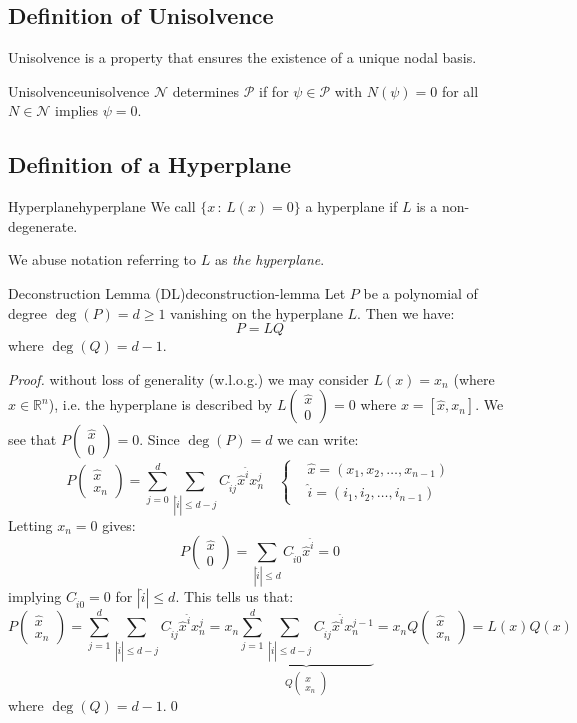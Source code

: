 \subsection{Definition of Unisolvence}
Unisolvence is a property that ensures the existence of a unique nodal basis.
\begin{definition}{Unisolvence}{unisolvence}
    $\mathcal{N}$ determines $\mathcal{P}$ if for $\psi \in \mathcal{P}$ with $N(\psi) = 0$ for all $N \in \mathcal{N}$ implies $\psi = 0$.
\end{definition}

\subsection{Definition of a Hyperplane}
\begin{definition}{Hyperplane}{hyperplane}
    We call $\{x \, : \, L(x) = 0\}$ a hyperplane if $L$ is a non-degenerate.
\end{definition}

We abuse notation referring to $L$ as \emph{the hyperplane}.

\begin{lemma}{Deconstruction Lemma (DL)}{deconstruction-lemma}
    Let $P$ be a polynomial of degree $\deg(P) = d \geq 1$ vanishing on the hyperplane $L$. Then we have:
    \[
        P = L Q
    \]
    where $\deg(Q) = d - 1$.
\end{lemma}
\begin{proof}
    without loss of generality (w.l.o.g.) we may consider $L(x) = x_n$ (where $x \in \mathbb{R}^n$), i.e. the hyperplane is described by $L(\substack{\hat{x} \\ 0}) = 0$ where $x = [\hat{x}, x_n]$.
    We see that $P(\substack{\hat{x} \\ 0}) = 0$. Since $\deg(P) = d$ we can write:
    \[
        P(\substack{\hat{x} \\ x_n}) = \sum_{j=0}^d \sum_{|\hat{i}| \leq d - j} C_{\hat{i}j} \hat{x}^{\hat{i}} x_n^j \quad \begin{cases}
             & \hat{x} = (x_1, x_2, \ldots, x_{n-1}) \\
             & \hat{i} = (i_1, i_2, \ldots, i_{n-1})
        \end{cases}
    \]
    Letting $x_n = 0$ gives:
    \[
        P(\substack{\hat{x} \\ 0}) = \sum_{|\hat{i}| \leq d} C_{\hat{i}0} \hat{x}^{\hat{i}} = 0
    \]
    implying $C_{\hat{i}0} = 0$ for $|\hat{i}| \leq d$. This tells us that:
    \[
        P(\substack{\hat{x} \\ x_n}) = \sum_{j=1}^d \sum_{|\hat{i}| \leq d - j} C_{\hat{i}j} \hat{x}^{\hat{i}} x_n^j = x_n \underbrace{\sum_{j=1}^d \sum_{|\hat{i}| \leq d - j} C_{\hat{i}j} \hat{x}^{\hat{i}} x_n^{j-1}}_{Q(\substack{\hat{x} \\ x_n})} = x_n Q(\substack{\hat{x} \\ x_n}) = L(x) Q(x)
    \]
    where $\deg(Q) = d - 1$.\qed
\end{proof}

